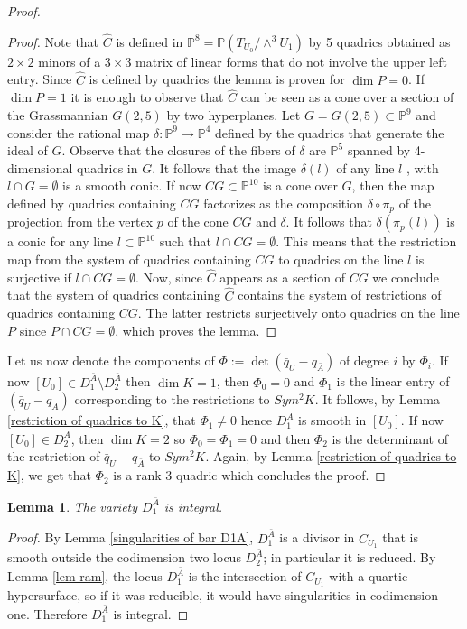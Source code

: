 \documentclass[a4paper,11pt]{amsart}
\newtheorem{lem}[thm]{Lemma}
\theoremstyle{definition}
\numberwithin{equation}{section}
\numberwithin{equation}{section} \theoremstyle{definition}
\begin{document}
\begin{proof}
  \begin{proof} Note that $\hat {C}$ is defined in $\mathbb{P}^8= {{\mathbb{P}}}(T_{U_0}/\wedge^3 U_1)$ by 5 quadrics obtained as $2\times 2$ minors  of a $3\times 3$ matrix of linear forms that do not involve the upper left entry. Since $\hat {C}$ is defined by quadrics the lemma is proven for $\dim P=0$. If $\dim P=1$ it is enough to observe that $\hat {C}$ can be seen as a cone over a section of the Grassmannian $G(2,5)$ by two hyperplanes. Let $G=G(2,5)\subset {{\mathbb{P}}}^9$ and consider the rational map $\delta: {{\mathbb{P}}}^9 \to {{\mathbb{P}}}^4$ defined by the quadrics that generate the ideal of $G$. Observe that the closures of the fibers of $\delta$ are $\mathbb{P}^5$ spanned by 4-dimensional quadrics in $G$. It follows that the image $\delta(l)$ of any line $l$ , with $l\cap G=\emptyset$ is a smooth conic.  If now $CG\subset {{\mathbb{P}}}^{10}$ is a cone over $G$, then the map defined by quadrics containing $CG$ factorizes as the  composition $\delta\circ \pi_p$ of the projection from the vertex $p$ of the cone $CG$ and $\delta$. It follows that $\delta(\pi_p (l))$ is a conic for any line $l\subset {{\mathbb{P}}}^{10}$ such that $l\cap CG=\emptyset$. This means that the restriction map from the  system of quadrics containing $CG$ to quadrics on the line $l$ is surjective if $l\cap CG=\emptyset$. Now, since $\hat{C}$ appears as a section of $CG$ we conclude that the system of quadrics containing $\hat{C}$ contains the system of restrictions of quadrics containing $CG$. The latter restricts surjectively onto quadrics on the line $P$ since $P\cap CG=\emptyset$, which proves the lemma.\end{proof} 
Let us now denote the components of $\Phi:=\det (\bar{q}_U-q_{\bar{A}})$ of degree $i $ by $\Phi_i$. 
If now $[U_0]\in D_1^{\bar{A}}\setminus D_2^{\bar{A}}$ then $\dim K=1$, then $\Phi_0=0$ and $\Phi_1$ is the linear entry of $(\bar{q}_U- q_{\bar{A}})$ corresponding to the restrictions to $Sym^2 K$. It follows, by Lemma \ref{restriction of quadrics to K}, that  $\Phi_1\neq 0$ hence $D_1^{\bar{A}}$ is smooth in $[U_0]$. 
If now $[U_0]\in D_2^{\bar{A}}$, then $\dim K=2$ so $\Phi_0=\Phi_1=0$ and then  $\Phi_2$ is the determinant of the restriction of $\bar{q}_U-q_{\bar{A}}$ to $Sym^2 K$. Again, by Lemma \ref{restriction of quadrics to K}, we get that  $\Phi_2$ is a rank 3 quadric  which concludes the proof.
  
  \end{proof}

\begin{lem}\label{lem int} The variety $D_1^{\bar{A}}$ is integral.
\end{lem}
\begin{proof}  By Lemma \ref{singularities of bar D1A},  $D_1^{\bar{A}}$ is a divisor in $C_{U_1}$ that is smooth outside the codimension two locus $D_2^{\bar{A}}$; in particular it is reduced.
By Lemma \ref{lem-ram}, the locus $D_1^{\bar{A}}$ is the intersection of $C_{U_1}$ with a quartic hypersurface,  so if it was reducible, it would have singularities in codimension one.
Therefore  $D_1^{\bar{A}}$ is integral.
\end{proof}
\end{document}
